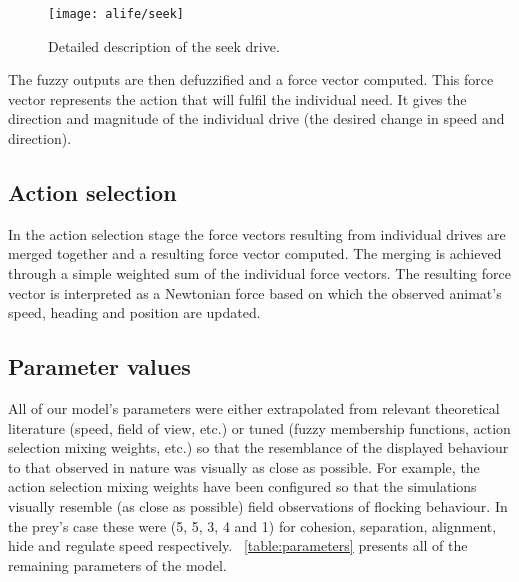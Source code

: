 \begin{subappendices}
\begin{figure}
	\texttt{[image: alife/seek]}
	\caption{Detailed description of the seek drive.}
	\label{figSeek}
\end{figure}

The fuzzy outputs are then defuzzified and a force vector computed. This force vector represents the action that will fulfil the individual need. It gives the direction and magnitude of the individual drive (the desired change in speed and direction). 

\subsection{Action selection}
In the action selection stage the force vectors resulting from individual drives are merged together and a resulting force vector computed. The merging is achieved through a simple weighted sum of the individual force vectors. The resulting force vector is interpreted as a Newtonian force based on which the observed animat's speed, heading and position are updated.

\subsection{Parameter values}
All of our model's parameters were either extrapolated from relevant theoretical literature (\eg speed, field of view, etc.) or tuned (\eg fuzzy membership functions, action selection mixing weights, etc.) so that the resemblance of the displayed behaviour to that observed in nature was visually as close as possible. For example, the action selection mixing weights have been configured so that the simulations visually resemble (as close as possible) field observations of flocking behaviour. In the prey's case these were (5, 5, 3, 4 and 1) for cohesion, separation, alignment, hide and regulate speed respectively. \tablename~\ref{table:parameters} presents all of the remaining parameters of the model. 


\end{subappendices}
